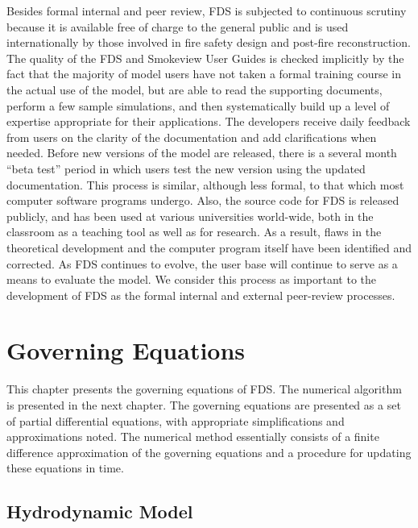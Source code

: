 \documentclass[11pt]{book}
\begin{document}
Besides formal internal and peer review, FDS is subjected to continuous scrutiny because
it is available free of charge to the general public and is used
internationally by those involved in fire safety design and post-fire reconstruction.
The quality of the FDS and Smokeview User Guides is checked implicitly by the fact that the
majority of model users have not taken a formal training course in the actual use of the model, but
are able to read the supporting documents, perform a few sample simulations, and then systematically build
up a level of expertise appropriate for their applications. The developers receive daily feedback from
users on the clarity of the documentation and add clarifications
when needed. Before new versions of the model are released, there is a several month ``beta test'' period
in which users test the new version using the updated documentation. This process is similar,
although less formal, to that which most computer software programs undergo.
Also, the source code for FDS is released publicly, and has been used at
various universities world-wide, both in the classroom as a teaching tool as well as for research.
As a result, flaws in the theoretical development and the computer program itself
have been identified and corrected. As FDS continues to evolve, the user base will continue to
serve as a means to evaluate the model. We consider this process as important to the development of FDS as the formal
internal and external peer-review processes.








\chapter{Governing Equations}

\label{basisformodel}

This chapter presents the governing equations of FDS. The numerical algorithm is presented in the next chapter.
The governing equations are presented as a set of
partial differential equations, with appropriate simplifications and approximations
noted. The numerical method essentially consists of a finite difference approximation of the governing equations and a procedure for
updating these equations in time.

\section{Hydrodynamic Model}
\label{govequations}
\end{document}
